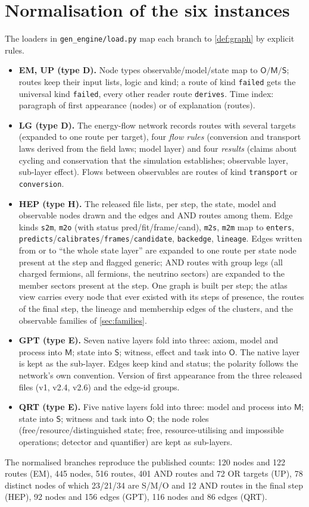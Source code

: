 \documentclass[11pt,a4paper,twoside,openany]{report}
\theoremstyle{plain}
\theoremstyle{definition}
\theoremstyle{remark}
\newcommand{\lay}[1]{\mathsf{#1}}
\newcommand{\id}[1]{\texttt{#1}}
\begin{document}
\section{Normalisation of the six instances}\label{sec:normalisation}
The loaders in \texttt{gen\_engine/load.py} map each branch to \cref{def:graph} by explicit rules.
\begin{itemize}[nosep]
\item \textbf{EM, UP (type D).} Node types observable/model/state map to $\lay O/\lay M/\lay S$; routes keep their input lists, logic and kind; a route of kind \texttt{failed} gets the universal kind \id{failed}, every other reader route \id{derives}. Time index: paragraph of first appearance (nodes) or of explanation (routes).
\item \textbf{LG (type D).} The energy-flow network records routes with several targets (expanded to one route per target), four \emph{flow rules} (conversion and transport laws derived from the field laws; model layer) and four \emph{results} (claims about cycling and conservation that the simulation establishes; observable layer, sub-layer effect). Flows between observables are routes of kind \id{transport} or \id{conversion}.
\item \textbf{HEP (type H).} The released file lists, per step, the state, model and observable nodes drawn and the edges and AND routes among them. Edge kinds \texttt{s2m}, \texttt{m2o} (with status pred/fit/frame/cand), \texttt{m2s}, \texttt{m2m} map to \id{enters}, \id{predicts}/\id{calibrates}/\id{frames}/\id{candidate}, \id{backedge}, \id{lineage}. Edges written from or to ``the whole state layer'' are expanded to one route per state node present at the step and flagged generic; AND routes with group legs (all charged fermions, all fermions, the neutrino sectors) are expanded to the member sectors present at the step. One graph is built per step; the atlas view carries every node that ever existed with its steps of presence, the routes of the final step, the lineage and membership edges of the clusters, and the observable families of \cref{sec:families}.
\item \textbf{GPT (type E).} Seven native layers fold into three: axiom, model and process into $\lay M$; state into $\lay S$; witness, effect and task into $\lay O$. The native layer is kept as the sub-layer. Edges keep kind and status; the polarity follows the network's own convention. Version of first appearance from the three released files (v1, v2.4, v2.6) and the edge-id groups.
\item \textbf{QRT (type E).} Five native layers fold into three: model and process into $\lay M$; state into $\lay S$; witness and task into $\lay O$; the node roles (free/resource/distinguished state; free, resource-utilising and impossible operations; detector and quantifier) are kept as sub-layers.
\end{itemize}
The normalised branches reproduce the published counts: 120 nodes and 122 routes (EM), 445 nodes, 516 routes, 401 AND routes and 72 OR targets (UP), 78 distinct nodes of which 23/21/34 are S/M/O and 12 AND routes in the final step (HEP), 92 nodes and 156 edges (GPT), 116 nodes and 86 edges (QRT).
\end{document}
